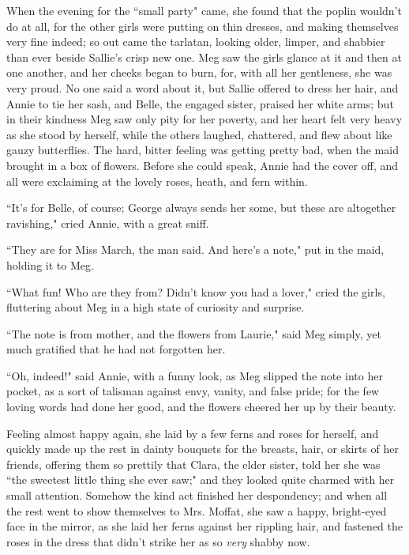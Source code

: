 When the evening for the ``small party" came, she found that the poplin
wouldn't do at all, for the other girls were putting on
thin dresses, and making themselves very fine indeed; so out came the
tarlatan, looking older, limper, and shabbier than ever beside
Sallie's crisp new one. Meg saw the girls glance at it
and then at one another, and her cheeks began to burn, for, with all her
gentleness, she was very proud. No one said a word about it, but Sallie
offered to dress her hair, and Annie to tie her sash, and Belle, the
engaged sister, praised her white arms; but in their kindness Meg saw
only pity for her poverty, and her heart felt very heavy as she stood by
herself, while the others laughed, chattered, and flew about like gauzy
butterflies. The hard, bitter feeling was getting pretty bad, when the
maid brought in a box of flowers. Before she could speak, Annie had the
cover off, and all were exclaiming at the lovely roses, heath, and fern
within.

``It's for Belle, of course; George always sends her
some, but these are altogether ravishing," cried Annie, with a great
sniff.

``They are for Miss March, the man said. And here's a
note," put in the maid, holding it to Meg.

``What fun! Who are they from? Didn't know you had a
lover," cried the girls, fluttering about Meg in a high state of
curiosity and surprise.

``The note is from mother, and the flowers from Laurie," said Meg simply,
yet much gratified that he had not forgotten her.

``Oh, indeed!" said Annie, with a funny look, as Meg slipped the note
into her pocket, as a sort of talisman against envy, vanity, and false
pride; for the few loving words had done her good, and the flowers
cheered her up by their beauty.

Feeling almost happy again, she laid by a few ferns and roses for
herself, and quickly made up the rest in dainty bouquets for the
breasts, hair, or skirts of her friends, offering them so prettily that
Clara, the elder sister, told her she was ``the sweetest little thing she
ever saw;" and they looked quite charmed with her small attention.
Somehow the kind act finished her despondency; and when all the rest
went to show themselves to Mrs. Moffat, she saw a happy, bright-eyed
face in the mirror, as she laid her ferns against her rippling hair, and
fastened the roses in the dress that didn't strike her
as so \emph{very} shabby now.

